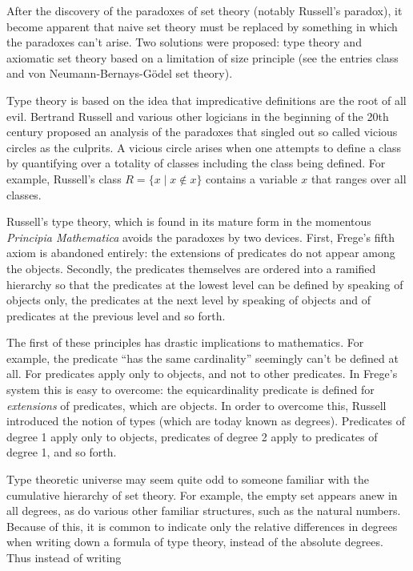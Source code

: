 \documentclass[12pt]{article}
\begin{document}
After the discovery of the paradoxes of set theory (notably Russell's paradox), it become apparent that naive set theory must be replaced by something in which the paradoxes can't arise. Two solutions were proposed: type theory and axiomatic set theory based on a limitation of size principle (see the entries class and von Neumann-Bernays-G\"odel set theory).

Type theory is based on the idea that impredicative definitions are the root of all evil. Bertrand Russell and various other logicians in the beginning of the 20th century proposed an analysis of the paradoxes that singled out so called vicious circles as the culprits. A vicious circle arises when one attempts to define a class by quantifying over a totality of classes including the class being defined. For example, Russell's class $R = \{x \mid x \not\in x\}$ contains a variable $x$ that ranges over all classes.

Russell's type theory, which is found in its mature form in the momentous {\em Principia Mathematica} avoids the paradoxes by two devices. First, Frege's fifth axiom is abandoned entirely: the extensions of predicates do not appear among the objects. Secondly, the predicates themselves are ordered into a ramified hierarchy so that the predicates at the lowest level can be defined by speaking of objects only, the predicates at the next level by speaking of objects and of predicates at the previous level and so forth.

The first of these principles has drastic implications to mathematics. For example, the predicate ``has the same cardinality'' seemingly can't be defined at all. For predicates apply only to objects, and not to other predicates. In Frege's system this is easy to overcome: the equicardinality predicate is defined for {\em extensions} of predicates, which are objects. In order to overcome this, Russell introduced the notion of types (which are today known as degrees). Predicates of degree 1 apply only to objects, predicates of degree 2 apply to predicates of degree 1, and so forth.

Type theoretic universe may seem quite odd to someone familiar with the cumulative hierarchy of set theory. For example, the empty set appears anew in all degrees, as do various other familiar structures, such as the natural numbers. Because of this, it is common to indicate only the relative differences in degrees when writing down a formula of type theory, instead of the absolute degrees. Thus instead of writing
\end{document}

